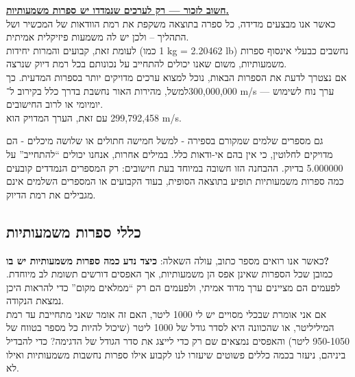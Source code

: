 \documentclass[
  hebrew,
  letterpaper,
  DIV=11,
  numbers=noendperiod]{scrreprt}
\begin{document}
\begin{tcolorbox}[enhanced jigsaw, colback=white, arc=.35mm, coltitle=black, breakable, toptitle=1mm, leftrule=.75mm, colbacktitle=quarto-callout-note-color!10!white, opacitybacktitle=0.6, bottomtitle=1mm, titlerule=0mm, opacityback=0, colframe=quarto-callout-note-color-frame, title=\textcolor{quarto-callout-note-color}{\faInfo}\hspace{0.5em}{הערה}, rightrule=.15mm, bottomrule=.15mm, toprule=.15mm, left=2mm]

\ul{\textbf{חשוב לזכור --- רק לערכים שנמדדו יש ספרות משמעותיות.}}\\
כאשר אנו מבצעים מדידה, כל ספרה בתוצאה משקפת את רמת הוודאות של המכשיר ושל
התהליך -- ולכן יש לה משמעות פיזיקלית אמיתית.\\
לעומת זאת, קבועים והמרות יחידות (כמו ‎1 kg = 2.20462 lb‎) נחשבים כבעלי
אינסוף ספרות משמעותיות, משום שאנו יכולים להתחייב על נכונותם בכל רמת דיוק
שנרצה.\\
אם נצטרך לדעת את הספרות הבאות, נוכל למצוא ערכים מדויקים יותר בספרות
המדעית. כך למשל, מהירות האור נחשבת בדרך כלל בקירוב ל־‎300,000,000 m/s‎ ---
ערך נוח לשימוש יומיומי או לרוב החישובים.\\
עם זאת, הערך המדויק הוא ‎299,792,458 m/s‎.

\end{tcolorbox}

{גם מספרים שלמים שמקורם בספירה - למשל חמישה חתולים או שלושה מיכלים - הם
מדויקים לחלוטין, כי אין בהם אי-ודאות כלל}. {במילים אחרות, אנחנו יכולים
``להתחייב'' על 5.000000 בדיוק}. {ההבחנה הזו חשובה במיוחד בעת חישובים: רק
המספרים הנמדדים קובעים כמה ספרות משמעותיות תופיע בתוצאה הסופית, בעוד
הקבועים או המספרים השלמים אינם מגבילים את רמת הדיוק}.

\subsection{\texorpdfstring{{כללי ספרות
משמעותיות}}{כללי ספרות משמעותיות}}\label{ux5dbux5dcux5dcux5d9-ux5e1ux5e4ux5e8ux5d5ux5ea-ux5deux5e9ux5deux5e2ux5d5ux5eaux5d9ux5d5ux5ea}

{כאשר אנו רואים מספר כתוב, עולה השאלה}: \textbf{{כיצד נדע כמה ספרות
משמעותיות יש בו}?}\\
{כמובן שכל הספרות שאינן אפס הן משמעותיות, אך האפסים דורשים תשומת לב
מיוחדת}. {לפעמים הם מציינים ערך מדוד אמיתי, ולפעמים הם רק ``ממלאים
מקום'' כדי להראות היכן נמצאת הנקודה.\\
אם אני אומרת שבכלי מסויים יש לי 1000 ליטר, האם זה אומר שאני מתחייבת עד
רמת המיליליטר, או שהכוונה היא לסדר גודל של 1000 ליטר (שיכול להיות כל
מספר בטווח של 950-1050 ליטר) והאפסים נמצאים שם רק כדי לייצג את סדר הגודל
של הדגימה? כדי להבדיל ביניהם, ניעזר בכמה כללים פשוטים שיעזרו לנו לקבוע
אילו ספרות נחשבות משמעותיות ואילו לא.}
\end{document}
